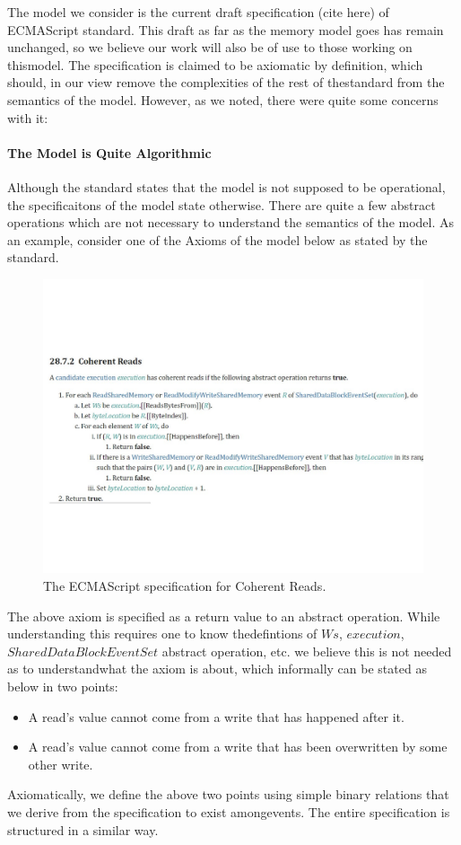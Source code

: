 
The model we consider is the current draft specification (cite here) of ECMAScript standard. 
This draft as far as the memory model goes has remain unchanged, so we believe our work will also be of use to those working on thismodel. 
The specification is claimed to be axiomatic by definition, which should, in our view remove the complexities of the rest of thestandard from the semantics of the model.
However, as we noted, there were quite some concerns with it: 

\paragraph{The Model is Quite Algorithmic}
    Although the standard states that the model is not supposed to be operational, the specificaitons of the model state otherwise. 
    There are quite a few abstract operations which are not necessary to understand the semantics of the model. 
    As an example, consider one of the Axioms of the model below as stated by the standard. 
    \begin{figure}[H]
        \centering 
        \includegraphics[scale=0.6]{4.ECMAScriptMemoryModel/ECMAScriptStdCoherentReads.pdf}
        \caption{The ECMAScript specification for Coherent Reads.}
    \end{figure}
    The above axiom is specified as a return value to an abstract operation. While understanding this requires one to know thedefintions of $Ws$, $execution$, $SharedDataBlockEventSet$ abstract operation, etc. we believe this is not needed as to understandwhat the axiom is about, which informally can be stated as below in two points:
    \begin{itemize}
        \item A read's value cannot come from a write that has happened after it. 
        \item A read's value cannot come from a write that has been overwritten by some other write.  
    \end{itemize}
    Axiomatically, we define the above two points using simple binary relations that we derive from the specification to exist amongevents. The entire specification is structured in a similar way. 

